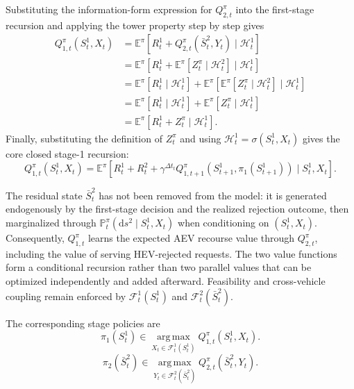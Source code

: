 Substituting the information-form expression for $Q_{2,t}^\pi$ into the first-stage recursion and applying the tower property step by step gives
\begin{align}Q_{1,t}^{\pi}(S_t^1,X_t)&=\mathbb E^\pi\!\left[R_t^1+Q_{2,t}^{\pi}(\bar S_t^2,Y_t)\mid\mathcal H_t^1\right]\nonumber\\ &=\mathbb E^\pi\!\left[R_t^1+\mathbb E^\pi\!\left[Z_t^\pi\mid\mathcal H_t^2\right]\mid\mathcal H_t^1\right]\nonumber\\ &=\mathbb E^\pi\!\left[R_t^1\mid\mathcal H_t^1\right]+\mathbb E^\pi\!\left[\mathbb E^\pi\!\left[Z_t^\pi\mid\mathcal H_t^2\right]\mid\mathcal H_t^1\right]\nonumber\\ &=\mathbb E^\pi\!\left[R_t^1\mid\mathcal H_t^1\right]+\mathbb E^\pi\!\left[Z_t^\pi\mid\mathcal H_t^1\right]\nonumber\\ &=\mathbb E^\pi\!\left[R_t^1+Z_t^\pi\mid\mathcal H_t^1\right].\label{eq:q1_tower_derivation}\end{align}
Finally, substituting the definition of $Z_t^\pi$ and using $\mathcal H_t^1=\sigma(S_t^1,X_t)$ gives the core closed stage-1 recursion:
\begin{equation}Q_{1,t}^{\pi}(S_t^1,X_t)=\mathbb E^{\pi}\!\left[R_t^1+R_t^2+\gamma^{\Delta t_t}Q_{1,t+1}^{\pi}\!\left(S_{t+1}^1,\pi_1(S_{t+1}^1)\right)\mid S_t^1,X_t\right].\label{eq:recourse_q1_expanded}\end{equation}

The residual state $\bar S_t^2$ has not been removed from the model: it is generated endogenously by the first-stage decision and the realized rejection outcome, then marginalized through $\mathbb P_t^\pi(\mathrm d s^2\mid S_t^1,X_t)$ when conditioning on $(S_t^1,X_t)$. Consequently, $Q_{1,t}^{\pi}$ learns the expected AEV recourse value through $Q_{2,t}^{\pi}$, including the value of serving HEV-rejected requests. The two value functions form a conditional recursion rather than two parallel values that can be optimized independently and added afterward. Feasibility and cross-vehicle coupling remain enforced by $\mathcal F_t^1(S_t^1)$ and $\mathcal F_t^2(\bar S_t^2)$.

The corresponding stage policies are
\begin{equation}\pi_1(S_t^1)\in\operatorname*{arg\,max}_{X_t\in\mathcal F_t^1(S_t^1)}Q_{1,t}^{\pi}(S_t^1,X_t).\label{eq:recourse_policy1}\end{equation}
\begin{equation}\pi_2(\bar S_t^2)\in\operatorname*{arg\,max}_{Y_t\in\mathcal F_t^2(\bar S_t^2)}Q_{2,t}^{\pi}(\bar S_t^2,Y_t).\label{eq:recourse_policy2}\end{equation}
